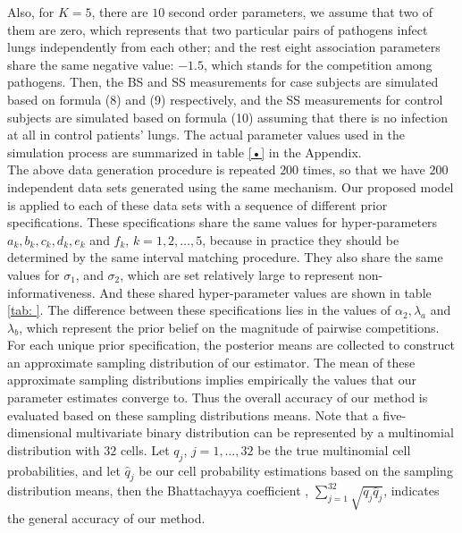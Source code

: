 \documentclass[11 pt, a4paper]{article}  %
\begin{document}
Also, for $K = 5$, there are $10$ second order parameters, we assume that two of them are zero, which represents that two particular pairs of pathogens infect lungs independently from each other; and the rest eight association parameters share the same negative value: $-1.5$, which stands for the competition among pathogens. Then, the BS and SS measurements for case subjects are simulated based on formula (8) and (9) respectively, and the SS measurements for control subjects are simulated based on formula (10) assuming that there is no infection at all in control patients' lungs. The actual parameter values used in the simulation process are summarized in table \ref{•} in the Appendix. \\

The above data generation procedure is repeated $200$ times, so that we have $200$ independent data sets generated using the same mechanism. Our proposed model is applied to each of these data sets with a sequence of different prior specifications. These specifications share the same values for hyper-parameters $a_k, b_k, c_k, d_k, e_k$ and $f_k$, $k = 1, 2, \ldots, 5$,  because in practice they should be determined by the same interval matching procedure. They also share the same values for $\sigma_1$, and $\sigma_2$, which are set relatively large to represent non-informativeness. And these shared hyper-parameter values are shown in table \ref{tab: }. The difference between these specifications lies in the values of $\alpha_2, \lambda_a$ and $\lambda_b$, which represent the prior belief on the magnitude of pairwise competitions.\\

For each unique prior specification, the posterior means are collected to construct an approximate sampling distribution of our estimator. The mean of these approximate sampling distributions implies empirically the values that our parameter estimates converge to. Thus the overall accuracy of our method is evaluated based on these sampling distributions means. Note that a five-dimensional multivariate binary distribution can be represented by a multinomial distribution with $32$ cells. Let $q_{j}$, $j = 1, \ldots, 32$ be the true multinomial cell probabilities, and let $\hat{q}_j$ be our cell probability estimations based on the sampling distribution means, then the Bhattachayya coefficient \cite{bhattachayya1943measure}, $\sum_{j=1}^{32}\sqrt{q_j \hat{q}_j}$, indicates the general accuracy of our method. \\
\end{document}
